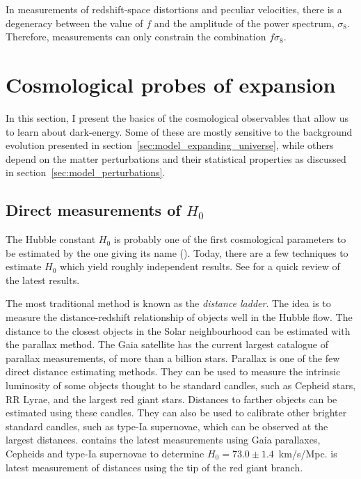     In measurements of redshift-space distortions and peculiar velocities, 
    there is a degeneracy between the value of $f$ and the
    amplitude of the power spectrum, $\sigma_8$. Therefore, 
    measurements can only constrain the combination $f\sigma_8$. 



    

\section{Cosmological probes of expansion}
\label{intro:probes}

    In this section, I present the basics of the cosmological 
    observables that allow us to learn about dark-energy. 
    Some of these are mostly sensitive to the background evolution
    presented in section~\ref{sec:model_expanding_universe}, while others 
    depend on the matter perturbations and their statistical properties as 
    discussed in section~\ref{sec:model_perturbations}. 

    \subsection{Direct measurements of \texorpdfstring{$H_0$}{the Hubble constant}}
    \label{intro:probes:h0}

    The Hubble constant $H_0$ is probably one of the first cosmological parameters 
    to be estimated by the one giving its name (\cite{hubbleRelationDistanceRadial1929}).
    Today, there are a few techniques to estimate $H_0$ which yield roughly independent results.
    See \cite{riessExpansionUniverseFaster2020} for a quick review of the latest results.  

    The most traditional method is known as the \emph{distance ladder}. 
    The idea is to measure the distance-redshift relationship of objects 
    well in the Hubble flow. 
    The distance to the closest objects in the Solar neighbourhood can 
    be estimated with the parallax method. The Gaia satellite has the current largest catalogue 
    of parallax measurements, of more than a billion stars. 
    Parallax is one of the few direct distance estimating methods. They can be used to 
    measure the intrinsic luminosity of some objects thought to be standard candles, such as 
    Cepheid stars, RR Lyrae, and the largest red giant stars. 
    Distances to farther objects can be estimated using these candles. They can also
    be used to calibrate other brighter standard candles, such as type-Ia supernovae, which 
    can be observed at the largest distances. 
    \cite{riessCosmicDistancesCalibrated2021a} contains the latest measurements using 
    Gaia parallaxes, Cepheids and type-Ia supernovae 
    to determine $H_0 = 73.0 \pm 1.4$~km/s/Mpc.  
    \cite{freedmanCarnegieChicagoHubbleProgram2019}
    is latest measurement of distances using the tip of the red giant branch. 
    
